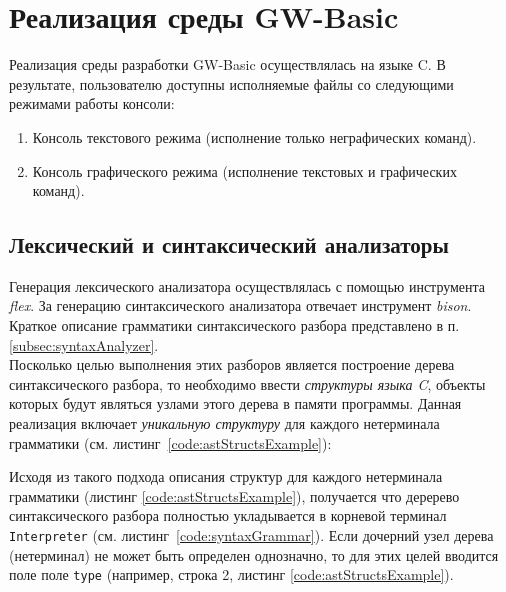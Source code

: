 \documentclass[12pt]{article}
\begin{document}
	\newpage
	\section{Реализация среды GW-Basic}
		\hspace{\parindent} Реализация среды разработки GW-Basic осуществлялась на языке C. В результате, пользователю доступны исполняемые файлы со следующими режимами работы консоли:
		\begin{enumerate}
			\item Консоль текстового режима (исполнение только неграфических команд).
			\item Консоль графического режима (исполнение текстовых и графических команд).
		\end{enumerate}
		
		\subsection{Лексический и синтаксический анализаторы}
			\hspace{\parindent}Генерация лексического анализатора осуществлялась с помощью инструмента {\it flex}.
			\indent За генерацию синтаксического анализатора отвечает инструмент {\it bison}. Краткое описание грамматики синтаксического разбора представлено в п. \ref{subsec:syntaxAnalyzer}. \\
			\indent Посколько целью выполнения этих разборов является построение дерева синтаксического разбора, то необходимо ввести {\it структуры языка C}, объекты которых будут являться узлами этого дерева в памяти программы. Данная реализация включает {\it уникальную структуру} для каждого нетерминала грамматики (см. листинг~\ref{code:astStructsExample}):
			
			
			\indent Исходя из такого подхода описания структур для каждого нетерминала грамматики (листинг \ref{code:astStructsExample}), получается что деререво синтаксического разбора полностью укладывается в корневой терминал {\tt Interpreter} (см. листинг~\ref{code:syntaxGrammar}). Если дочерний узел дерева (нетерминал) не может быть определен однозначно, то для этих целей вводится поле поле {\tt type} (например, строка 2, листинг \ref{code:astStructsExample}). 
\end{document}
